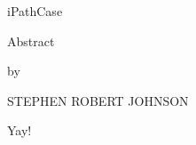 \begin{center}
    iPathCase

    Abstract

    by

    STEPHEN ROBERT JOHNSON

    Yay!
\end{center}
